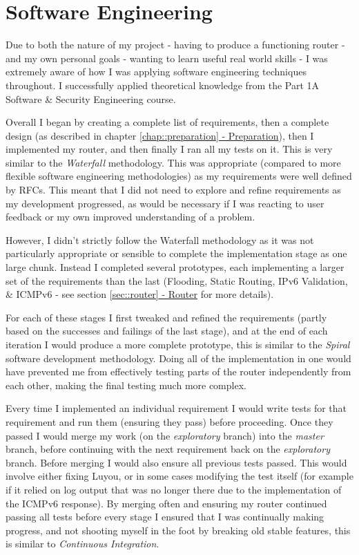 \documentclass[12pt,a4paper,twoside,openany]{report}
\begin{document}
\section{Software Engineering}
\label{sec::soft_eng}

Due to both the nature of my project - having to produce a functioning router - and my own personal goals - wanting to learn useful real world skills - I was extremely aware of how I was applying software engineering techniques throughout.  I successfully applied theoretical knowledge from the Part 1A Software \& Security Engineering course.

\bigskip

Overall I began by creating a complete list of requirements, then a complete design (as described in chapter \ref{chap::preparation}\hyperref[chap::preparation]{ - Preparation}), then I implemented my router, and then finally I ran all my tests on it.  This is very similar to the \textit{Waterfall} methodology.  This was appropriate (compared to more flexible software engineering methodologies) as my requirements were well defined by RFCs. This meant that I did not need to explore and refine requirements as my development progressed, as would be necessary if I was reacting to user feedback or my own improved understanding of a problem.

\bigskip

However, I didn't strictly follow the Waterfall methodology as it was not particularly appropriate or sensible to complete the implementation stage as one large chunk.  Instead I completed several prototypes, each implementing a larger set of the requirements than the last (Flooding, Static Routing, IPv6 Validation, \& ICMPv6 - see section \ref{sec::router}\hyperref[sec::router]{ - Router} for more details). 

For each of these stages I first tweaked and refined the requirements (partly based on the successes and failings of the last stage), and at the end of each iteration I would produce a more complete prototype, this is similar to the \textit{Spiral} software development methodology. Doing all of the implementation in one would have prevented me from effectively testing parts of the router independently from each other, making the final testing much more complex.

\bigskip

Every time I implemented an individual requirement I would write tests for that requirement and run them (ensuring they pass) before proceeding.  Once they passed I would merge my work (on the \textit{exploratory} branch) into the \textit{master} branch, before continuing with the next requirement back on the \textit{exploratory} branch.  Before merging I would also ensure all previous tests passed.  This would involve either fixing Luyou, or in some cases modifying the test itself (for example if it relied on log output that was no longer there due to the implementation of the ICMPv6 response).  By merging often and ensuring my router continued passing all tests before every stage I ensured that I was continually making progress, and not shooting myself in the foot by breaking old stable features, this is similar to \textit{Continuous Integration}.
\end{document}
